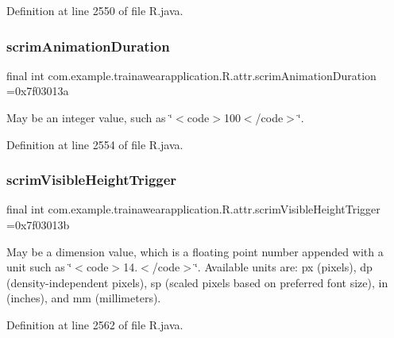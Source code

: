 Definition at line 2550 of file R.\+java.

\mbox{\label{classcom_1_1example_1_1trainawearapplication_1_1_r_1_1attr_a38b74637a2ac4b4440002d246e97a35f}} 
\subsubsection{\texorpdfstring{scrimAnimationDuration}{scrimAnimationDuration}}
{\footnotesize\ttfamily final int com.\+example.\+trainawearapplication.\+R.\+attr.\+scrim\+Animation\+Duration =0x7f03013a\hspace{0.3cm}{\ttfamily [static]}}

May be an integer value, such as \char`\"{}$<$code$>$100$<$/code$>$\char`\"{}. 

Definition at line 2554 of file R.\+java.

\mbox{\label{classcom_1_1example_1_1trainawearapplication_1_1_r_1_1attr_a07ad69347e048de70fa584d4a12af24c}} 
\subsubsection{\texorpdfstring{scrimVisibleHeightTrigger}{scrimVisibleHeightTrigger}}
{\footnotesize\ttfamily final int com.\+example.\+trainawearapplication.\+R.\+attr.\+scrim\+Visible\+Height\+Trigger =0x7f03013b\hspace{0.3cm}{\ttfamily [static]}}

May be a dimension value, which is a floating point number appended with a unit such as \char`\"{}$<$code$>$14.\+5sp$<$/code$>$\char`\"{}. Available units are\+: px (pixels), dp (density-\/independent pixels), sp (scaled pixels based on preferred font size), in (inches), and mm (millimeters). 

Definition at line 2562 of file R.\+java.


